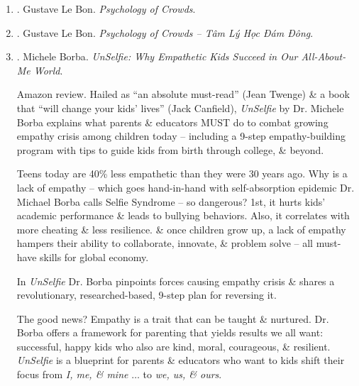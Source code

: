 \documentclass{article}
\begin{document}
\begin{enumerate}
	\item \cite{Bon_crowd_psychology}. {\sc Gustave Le Bon}. {\it Psychology of Crowds}.

	\item \cite{Bon_crowd_psychology_VN}. {\sc Gustave Le Bon}. {\it Psychology of Crowds -- Tâm Lý Học Đám Đông}.\hfill{\sf[done]}

	\item \cite{Borba_sympathy}. {\sc Michele Borba}. {\it UnSelfie: Why Empathetic Kids Succeed in Our All-About-Me World}. {}

	{\sf Amazon review.} Hailed as ``an absolute must-read'' ({\sc Jean Twenge}) \& a book that ``will change your kids' lives'' ({\sc Jack Canfield}), {\it UnSelfie} by Dr. {\sc Michele Borba} explains what parents \& educators MUST do to combat growing empathy crisis among children today -- including a 9-step empathy-building program with tips to guide kids from birth through college, \& beyond.

	Teens today are 40\% less empathetic than they were 30 years ago. Why is a lack of empathy -- which goes hand-in-hand with self-absorption epidemic Dr. {\sc Michael Borba} calls Selfie Syndrome -- so dangerous? 1st, it hurts kids' academic performance \& leads to bullying behaviors. Also, it correlates with more cheating \& less resilience. \& once children grow up, a lack of empathy hampers their ability to collaborate, innovate, \& problem solve -- all must-have skills for global economy.

	In {\it UnSelfie} Dr. {\sc Borba} pinpoints forces causing empathy crisis \& shares a revolutionary, researched-based, 9-step plan for reversing it.

	The good news? Empathy is a trait that can be taught \& nurtured. Dr. {\sc Borba} offers a framework for parenting that yields results we all want: successful, happy kids who also are kind, moral, courageous, \& resilient. {\it UnSelfie} is a blueprint for parents \& educators who want to kids shift their focus from {\it I, me, \& mine} $\ldots$ to {\it we, us, \& ours}.


\end{enumerate}
\end{document}
